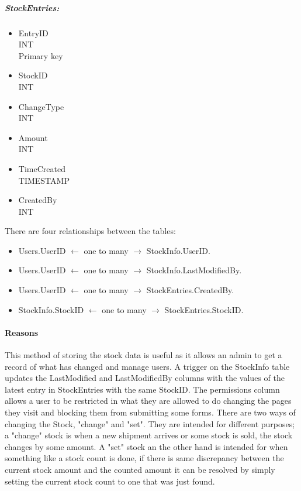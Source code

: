 \documentclass[12pt,a4paper]{report}
\begin{document}
\begin{multicols}{3}
\begin{itemize}
	\end{itemize}
	\columnbreak
	\subparagraph{StockEntries:}
	\begin{itemize}
		\item EntryID \\ INT \\ Primary key
		\item StockID \\ INT
		\item ChangeType \\ INT
		\item Amount \\ INT
		\item TimeCreated \\ TIMESTAMP
		\item CreatedBy \\ INT
	\end{itemize}
	\end{multicols}
	There are four relationships between the tables:
	\begin{itemize}
		\item Users.UserID $\leftarrow$ one to many $\rightarrow$ StockInfo.UserID.
		\item Users.UserID $\leftarrow$ one to many $\rightarrow$ StockInfo.LastModifiedBy.
		\item Users.UserID $\leftarrow$ one to many $\rightarrow$ StockEntries.CreatedBy.
		\item StockInfo.StockID $\leftarrow$ one to many $\rightarrow$ StockEntries.StockID.
	\end{itemize}
	\paragraph{Reasons}
	This method of storing the stock data is useful as it allows an admin to get a record of what has changed and manage users. A trigger on the StockInfo table updates the LastModified and LastModifiedBy columns with the values of the latest entry in StockEntries with the same StockID. The permissions column allows a user to be restricted in what they are allowed to do changing the pages they visit and blocking them from submitting some forms. There are two ways of changing the Stock, "change" and "set". They are intended for different purposes; a "change" stock is when a new shipment arrives or some stock is sold, the stock changes by some amount. A "set" stock an the other hand is intended for when something like a stock count is done, if there is same discrepancy between the current stock amount and the counted amount it can be resolved by simply setting the current stock count to one that was just found.
\end{document}
